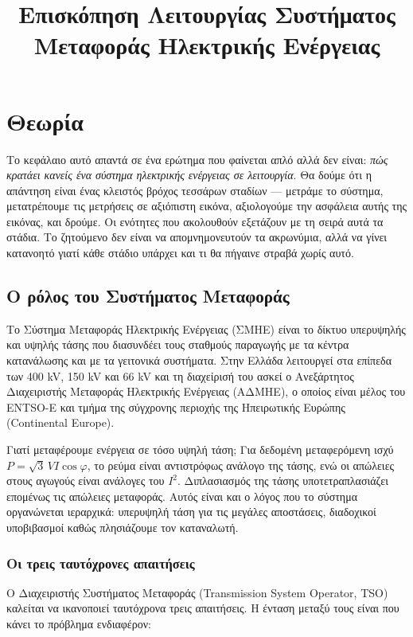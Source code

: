 \title{Επισκόπηση Λειτουργίας Συστήματος Μεταφοράς Ηλεκτρικής Ενέργειας}

\section{Θεωρία}
\label{kef-01-theoria}

Το κεφάλαιο αυτό απαντά σε ένα ερώτημα που φαίνεται απλό αλλά δεν είναι: \emph{πώς
κρατάει κανείς ένα σύστημα ηλεκτρικής ενέργειας σε λειτουργία}. Θα δούμε ότι η απάντηση
είναι ένας κλειστός βρόχος τεσσάρων σταδίων — μετράμε το σύστημα, μετατρέπουμε τις
μετρήσεις σε αξιόπιστη εικόνα, αξιολογούμε την ασφάλεια αυτής της εικόνας, και δρούμε.
Οι ενότητες που ακολουθούν εξετάζουν με τη σειρά αυτά τα στάδια. Το ζητούμενο δεν είναι
να απομνημονευτούν τα ακρωνύμια, αλλά να γίνει κατανοητό γιατί κάθε στάδιο υπάρχει και
τι θα πήγαινε στραβά χωρίς αυτό.

\subsection{Ο ρόλος του Συστήματος Μεταφοράς}

Το Σύστημα Μεταφοράς Ηλεκτρικής Ενέργειας (ΣΜΗΕ) είναι το δίκτυο υπερυψηλής και υψηλής
τάσης που διασυνδέει τους σταθμούς παραγωγής με τα κέντρα κατανάλωσης και με τα γειτονικά
συστήματα. Στην Ελλάδα λειτουργεί στα επίπεδα των 400 kV, 150 kV και 66 kV και τη
διαχείρισή του ασκεί ο Ανεξάρτητος Διαχειριστής Μεταφοράς Ηλεκτρικής Ενέργειας (ΑΔΜΗΕ),
ο οποίος είναι μέλος του ENTSO-E και τμήμα της σύγχρονης περιοχής της Ηπειρωτικής Ευρώπης
(Continental Europe).

Γιατί μεταφέρουμε ενέργεια σε τόσο υψηλή τάση; Για δεδομένη μεταφερόμενη ισχύ
$P = \sqrt{3}\,V I \cos\varphi$, το ρεύμα είναι αντιστρόφως ανάλογο της τάσης, ενώ οι
απώλειες στους αγωγούς είναι ανάλογες του $I^2$. Διπλασιασμός της τάσης υποτετραπλασιάζει
επομένως τις απώλειες μεταφοράς. Αυτός είναι και ο λόγος που το σύστημα οργανώνεται
ιεραρχικά: υπερυψηλή τάση για τις μεγάλες αποστάσεις, διαδοχικοί υποβιβασμοί καθώς
πλησιάζουμε τον καταναλωτή.

\subsubsection*{Οι τρεις ταυτόχρονες απαιτήσεις}

Ο Διαχειριστής Συστήματος Μεταφοράς (Transmission System Operator, TSO) καλείται να
ικανοποιεί ταυτόχρονα τρεις απαιτήσεις. Η ένταση μεταξύ τους είναι που κάνει το πρόβλημα
ενδιαφέρον:

